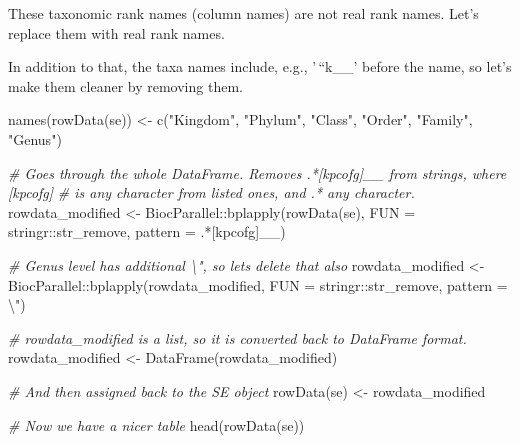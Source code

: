 \documentclass[
]{book}
\newenvironment{Shaded}{\begin{snugshade}}{\end{snugshade}}
\newcommand{\AttributeTok}[1]{\textcolor[rgb]{0.77,0.63,0.00}{#1}}
\newcommand{\CommentTok}[1]{\textcolor[rgb]{0.56,0.35,0.01}{\textit{#1}}}
\newcommand{\FunctionTok}[1]{\textcolor[rgb]{0.00,0.00,0.00}{#1}}
\newcommand{\NormalTok}[1]{#1}
\newcommand{\OtherTok}[1]{\textcolor[rgb]{0.56,0.35,0.01}{#1}}
\newcommand{\SpecialCharTok}[1]{\textcolor[rgb]{0.00,0.00,0.00}{#1}}
\newcommand{\StringTok}[1]{\textcolor[rgb]{0.31,0.60,0.02}{#1}}
\begin{document}
These taxonomic rank names (column names) are not real rank
names. Let's replace them with real rank names.

In addition to that, the taxa names include, e.g., '\,``k\_\_' before the name, so let's
make them cleaner by removing them.

\begin{Shaded}
\begin{Highlighting}[]
\FunctionTok{names}\NormalTok{(}\FunctionTok{rowData}\NormalTok{(se)) }\OtherTok{\textless{}{-}} \FunctionTok{c}\NormalTok{(}\StringTok{"Kingdom"}\NormalTok{, }\StringTok{"Phylum"}\NormalTok{, }\StringTok{"Class"}\NormalTok{, }\StringTok{"Order"}\NormalTok{, }
                        \StringTok{"Family"}\NormalTok{, }\StringTok{"Genus"}\NormalTok{)}

\CommentTok{\# Goes through the whole DataFrame. Removes \textquotesingle{}.*[kpcofg]\_\_\textquotesingle{} from strings, where [kpcofg] }
\CommentTok{\# is any character from listed ones, and .* any character.}
\NormalTok{rowdata\_modified }\OtherTok{\textless{}{-}}\NormalTok{ BiocParallel}\SpecialCharTok{::}\FunctionTok{bplapply}\NormalTok{(}\FunctionTok{rowData}\NormalTok{(se), }
                                           \AttributeTok{FUN =}\NormalTok{ stringr}\SpecialCharTok{::}\NormalTok{str\_remove, }
                                           \AttributeTok{pattern =} \StringTok{\textquotesingle{}.*[kpcofg]\_\_\textquotesingle{}}\NormalTok{)}

\CommentTok{\# Genus level has additional \textquotesingle{}\textbackslash{}"\textquotesingle{}, so let\textquotesingle{}s delete that also}
\NormalTok{rowdata\_modified }\OtherTok{\textless{}{-}}\NormalTok{ BiocParallel}\SpecialCharTok{::}\FunctionTok{bplapply}\NormalTok{(rowdata\_modified, }
                                           \AttributeTok{FUN =}\NormalTok{ stringr}\SpecialCharTok{::}\NormalTok{str\_remove, }
                                           \AttributeTok{pattern =} \StringTok{\textquotesingle{}}\SpecialCharTok{\textbackslash{}"}\StringTok{\textquotesingle{}}\NormalTok{)}

\CommentTok{\# rowdata\_modified is a list, so it is converted back to DataFrame format. }
\NormalTok{rowdata\_modified }\OtherTok{\textless{}{-}} \FunctionTok{DataFrame}\NormalTok{(rowdata\_modified)}

\CommentTok{\# And then assigned back to the SE object}
\FunctionTok{rowData}\NormalTok{(se) }\OtherTok{\textless{}{-}}\NormalTok{ rowdata\_modified}

\CommentTok{\# Now we have a nicer table}
\FunctionTok{head}\NormalTok{(}\FunctionTok{rowData}\NormalTok{(se))}
\end{Highlighting}
\end{Shaded}
\end{document}
